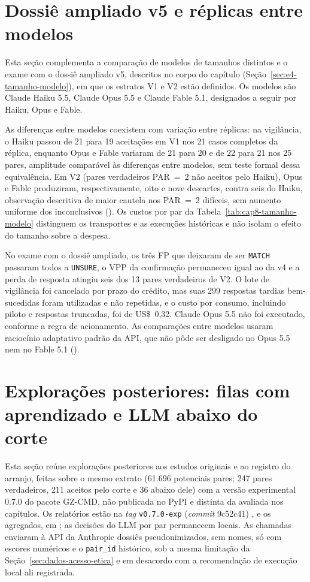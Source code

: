 \section{Dossiê ampliado v5 e réplicas entre modelos}\label{sec:e4-ap-dossie}

Esta seção complementa a comparação de modelos de tamanhos distintos e o exame com o dossiê ampliado v5, descritos no corpo do capítulo (Seção~\ref{sec:e4-tamanho-modelo}), em que os estratos V1 e V2 estão definidos. Os modelos são Claude Haiku 5.5, Claude Opus 5.5 e Claude Fable 5.1, designados a seguir por Haiku, Opus e Fable.

As diferenças entre modelos coexistem com variação entre réplicas: na vigilância, o Haiku passou de 21 para 19 aceitações em V1 nos 21 casos completos da réplica, enquanto Opus e Fable variaram de 21 para 20 e de 22 para 21 nos 25 pares, amplitude comparável às diferenças entre modelos, sem teste formal dessa equivalência. Em V2 (pares verdadeiros PAR~=~2 não aceitos pelo Haiku), Opus e Fable produziram, respectivamente, oito e nove descartes, contra seis do Haiku, observação descritiva de maior cautela nos PAR~=~2 difíceis, sem aumento uniforme dos inconclusivos (). Os custos por par da Tabela~\ref{tab:cap8-tamanho-modelo} distinguem os transportes e as execuções históricas e não isolam o efeito do tamanho sobre a despesa.

No exame com o dossiê ampliado, os três FP que deixaram de ser \texttt{MATCH} passaram todos a \texttt{UNSURE}, o VPP da confirmação permaneceu igual ao da v4 e a perda de resposta atingiu seis dos 13 pares verdadeiros de V2. O lote de vigilância foi cancelado por prazo do crédito, mas suas 299 respostas tardias bem-sucedidas foram utilizadas e não repetidas, e o custo por consumo, incluindo piloto e respostas truncadas, foi de US\$~0,32. Claude Opus 5.5 não foi executado, conforme a regra de acionamento. As comparações entre modelos usaram raciocínio adaptativo padrão da API, que não pôde ser desligado no Opus 5.5 nem no Fable 5.1 ().

\section{Explorações posteriores: filas com aprendizado e LLM abaixo do corte}\label{sec:e4-ap-filas-llm}

Esta seção reúne explorações posteriores aos estudos originais e ao registro do arranjo, feitas sobre o mesmo extrato (61.696 potenciais pares; 247 pares verdadeiros, 211 aceitos pelo corte e 36 abaixo dele) com a versão experimental 0.7.0 do pacote GZ-CMD, não publicada no PyPI e distinta da avaliada nos capítulos. Os relatórios estão na \textit{tag} \texttt{v0.7.0-exp} (\textit{commit} 9c52c41) \cite{Jardim2026gzcmd}, e os agregados, em  \cite{Jardim2026phdrepo}; as decisões do LLM por par permanecem locais. As chamadas enviaram à API da Anthropic dossiês pseudonimizados, sem nomes, só com escores numéricos e o \texttt{pair\_id} histórico, sob a mesma limitação da Seção~\ref{sec:dados-acesso-etica} e em desacordo com a recomendação de execução local ali registrada.

